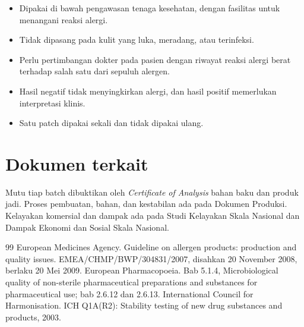 \documentclass[11pt,a4paper]{article}
\begin{document}
\begin{itemize}
\item Dipakai di bawah pengawasan tenaga kesehatan, dengan fasilitas untuk menangani reaksi alergi.
\item Tidak dipasang pada kulit yang luka, meradang, atau terinfeksi.
\item Perlu pertimbangan dokter pada pasien dengan riwayat reaksi alergi berat terhadap salah satu dari sepuluh alergen.
\item Hasil negatif tidak menyingkirkan alergi, dan hasil positif memerlukan interpretasi klinis.
\item Satu patch dipakai sekali dan tidak dipakai ulang.
\end{itemize}

\section{Dokumen terkait}

Mutu tiap batch dibuktikan oleh \emph{Certificate of Analysis} bahan baku dan produk jadi. Proses pembuatan, bahan, dan kestabilan ada pada Dokumen Produksi. Kelayakan komersial dan dampak ada pada Studi Kelayakan Skala Nasional dan Dampak Ekonomi dan Sosial Skala Nasional.

\begin{thebibliography}{99}
\small
\setlength{\itemsep}{2pt}
 European Medicines Agency. Guideline on allergen products: production and quality issues. EMEA/CHMP/BWP/304831/2007, disahkan 20 November 2008, berlaku 20 Mei 2009.
 European Pharmacopoeia. Bab 5.1.4, Microbiological quality of non-sterile pharmaceutical preparations and substances for pharmaceutical use; bab 2.6.12 dan 2.6.13.
 International Council for Harmonisation. ICH Q1A(R2): Stability testing of new drug substances and products, 2003.
\end{thebibliography}
\end{document}
